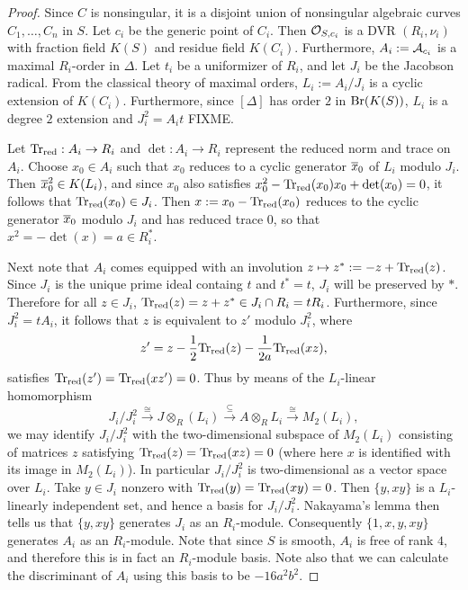 \begin{proof}
Since $C$ is nonsingular, it is a disjoint union of nonsingular algebraic curves $C_1,\dots, C_n$ in $S$.  Let $c_i$ be the generic point of $C_i$.  Then $\mathcal{O}_{S,c_i}$ is a DVR $(R_i,\nu_i)$ with fraction field $K(S)$ and residue field $K(C_i)$.  Furthermore, $A_i := \mathcal{A}_{c_i}$ is a maximal $R_i$-order in $\Delta$.  Let $t_i$ be a uniformizer of $R_i$, and let $J_i$ be the Jacobson radical.  From the classical theory of maximal orders, $L_i := A_i/J_i$ is a cyclic extension of $K(C_i)$.  Furthermore, since $[\Delta]$ has order $2$ in $\textnormal{Br}(K(S))$, $L_i$ is a degree $2$ extension and $J_i^2 = A_it$ FIXME.

Let $\textnormal{Tr}_{\text{red}}: A_i\rightarrow R_i$ and $\det: A_i\rightarrow R_i$ represent the reduced norm and trace on $A_i$.  Choose $x_0\in A_i$ such that $x_0$ reduces to a cyclic generator $\overline{x}_0$ of $L_i$ modulo $J_i$.  Then $\overline{x}_0^2\in K(L_i)$, and since $x_0$ also satisfies $x_0^2 - \textnormal{Tr}_{\text{red}}(x_0)x_0 + \det(x_0) = 0$, it follows that $\textnormal{Tr}_{\text{red}}(x_0)\in J_i$.  Then $x := x_0-\textnormal{Tr}_{\text{red}}(x_0)$ reduces to the cyclic generator $\overline{x}_0$ modulo $J_i$ and has reduced trace $0$, so that $x^2 = -\det(x) = a\in R_i^*$.

Next note that $A_i$ comes equipped with an involution $z\mapsto z^* := -z + \textnormal{Tr}_{\text{red}}(z)$.  Since $J_i$ is the unique prime ideal containg $t$ and $t^*=t$, $J_i$ will be preserved by $*$.  Therefore for all $z\in J_i$, $\textnormal{Tr}_{\text{red}}(z) = z + z^* \in J_i\cap R_i = tR_i$.  Furthermore, since $J_i^2 = tA_i$, it follows that $z$ is equivalent to $z'$ modulo $J_i^2$, where
$$z' = z - \frac{1}{2}\textnormal{Tr}_{\text{red}}(z) - \frac{1}{2a}\textnormal{Tr}_{\text{red}}(xz),$$
satisfies $\textnormal{Tr}_{\text{red}}(z') = \textnormal{Tr}_{\text{red}}(xz') = 0$.  Thus by means of the $L_i$-linear homomorphism
$$J_i/J_i^2\xrightarrow{\cong} J\otimes_R (L_i)\xrightarrow{\subseteq} A\otimes_R L_i\xrightarrow{\cong} M_2(L_i),$$
we may identify $J_i/J_i^2$ with the two-dimensional subspace of $M_2(L_i)$ consisting of matrices $z$ satisfying $\textnormal{Tr}_{\text{red}}(z) = \textnormal{Tr}_{\text{red}}(xz) = 0$ (where here $x$ is identified with its image in $M_2(L_i)$).  In particular $J_i/J_i^2$ is two-dimensional as a vector space over $L_i$.  Take $y\in J_i$ nonzero with $\textnormal{Tr}_{\text{red}}(y) = \textnormal{Tr}_{\text{red}}(xy) = 0$.  Then $\{y,xy\}$ is a $L_i$-linearly independent set, and hence a basis for $J_i/J_i^2$.  Nakayama's lemma then tells us that $\{y,xy\}$ generates $J_i$ as an $R_i$-module.  Consequently $\{1,x,y,xy\}$ generates $A_i$ as an $R_i$-module.  Note that since $S$ is smooth, $A_i$ is free of rank $4$, and therefore this is in fact an $R_i$-module basis.  Note also that we can calculate the discriminant of $A_i$ using this basis to be $-16a^2b^2$.


\end{proof}
